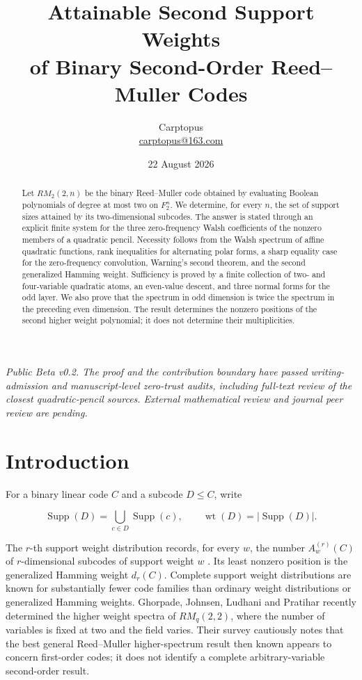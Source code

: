 \documentclass[11pt]{article}
\title{Attainable Second Support Weights\\of Binary Second-Order Reed--Muller Codes}
\author{Carptopus\\\href{mailto:carptopus@163.com}{carptopus@163.com}}
\date{22 August 2026}
\theoremstyle{remark}
\begin{document}
\maketitle

\begin{center}
\small\itshape
Public Beta v0.2. The proof and the contribution boundary have passed
writing-admission and manuscript-level zero-trust audits, including full-text review of the closest
quadratic-pencil sources. External mathematical review and journal peer review are pending.
\end{center}
\vspace{0.8em}

\begin{abstract}

Let $RM_2(2,n)$ be the binary Reed--Muller code obtained by evaluating Boolean polynomials of degree at most two on $F_2^n$. We determine, for every $n$, the set of support sizes attained by its two-dimensional subcodes. The answer is stated through an explicit finite system for the three zero-frequency Walsh coefficients of the nonzero members of a quadratic pencil. Necessity follows from the Walsh spectrum of affine quadratic functions, rank inequalities for alternating polar forms, a sharp equality case for the zero-frequency convolution, Warning's second theorem, and the second generalized Hamming weight. Sufficiency is proved by a finite collection of two- and four-variable quadratic atoms, an even-value descent, and three normal forms for the odd layer. We also prove that the spectrum in odd dimension is twice the spectrum in the preceding even dimension. The result determines the nonzero positions of the second higher weight polynomial; it does not determine their multiplicities.

\end{abstract}
\section{Introduction}

For a binary linear code $C$ and a subcode $D \le  C$, write

\[
\operatorname{Supp}(D)
=\bigcup_{c\in D}\operatorname{Supp}(c),
\qquad
\operatorname{wt}(D)=|\operatorname{Supp}(D)|.
\]

The $r$-th support weight distribution records, for every $w$, the number $A_w^{(r)}(C)$ of $r$-dimensional subcodes of support weight $w$ \cite{ref5}. Its least nonzero position is the generalized Hamming weight $d_r(C)$. Complete support weight distributions are known for substantially fewer code families than ordinary weight distributions or generalized Hamming weights. Ghorpade, Johnsen, Ludhani and Pratihar \cite{ref4} recently determined the higher weight spectra of $RM_q(2,2)$, where the number of variables is fixed at two and the field varies. Their survey cautiously notes that the best general Reed--Muller higher-spectrum result then known appears to concern first-order codes; it does not identify a complete arbitrary-variable second-order result.
\end{document}
